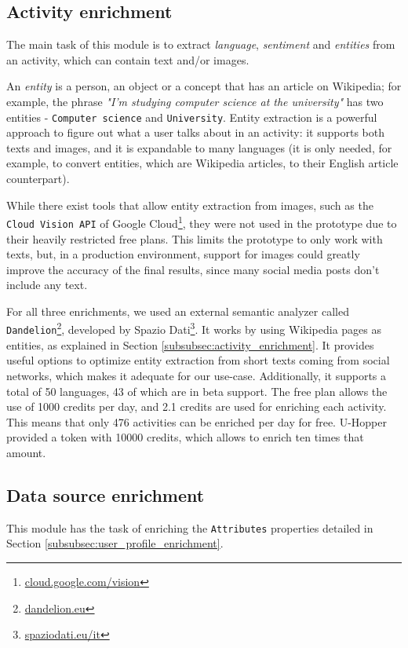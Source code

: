\subsection{Activity enrichment}
The main task of this module is to extract \emph{language}, \emph{sentiment} and \emph{entities} from an activity, which can contain text and/or images.

An \emph{entity} is a person, an object or a concept that has an article on Wikipedia; for example, the phrase \textit{"I'm studying computer science at the university"} has two entities - \texttt{Computer science} and \texttt{University}. Entity extraction is a powerful approach to figure out what a user talks about in an activity: it supports both texts and images, and it is expandable to many languages (it is only needed, for example, to convert entities, which are Wikipedia articles, to their English article counterpart).

While there exist tools that allow entity extraction from images, such as the \texttt{Cloud Vision API} of Google Cloud\footnote{\url{cloud.google.com/vision}}, they were not used in the prototype due to their heavily restricted free plans. This limits the prototype to only work with texts, but, in a production environment, support for images could greatly improve the accuracy of the final results, since many social media posts don't include any text.

For all three enrichments, we used an external semantic analyzer called \texttt{Dandelion}\footnote{\url{dandelion.eu}}, developed by Spazio Dati\footnote{\url{spaziodati.eu/it}}. It works by using Wikipedia pages as entities, as explained in Section \ref{subsubsec:activity_enrichment}. It provides useful options to optimize entity extraction from short texts coming from social networks, which makes it adequate for our use-case. Additionally, it supports a total of 50 languages, 43 of which are in beta support. The free plan allows the use of 1000 credits per day, and 2.1 credits are used for enriching each activity. This means that only 476 activities can be enriched per day for free. U-Hopper provided a token with 10000 credits, which allows to enrich ten times that amount.

\subsection{Data source enrichment}
This module has the task of enriching the \texttt{Attributes} properties detailed in Section \ref{subsubsec:user_profile_enrichment}.

